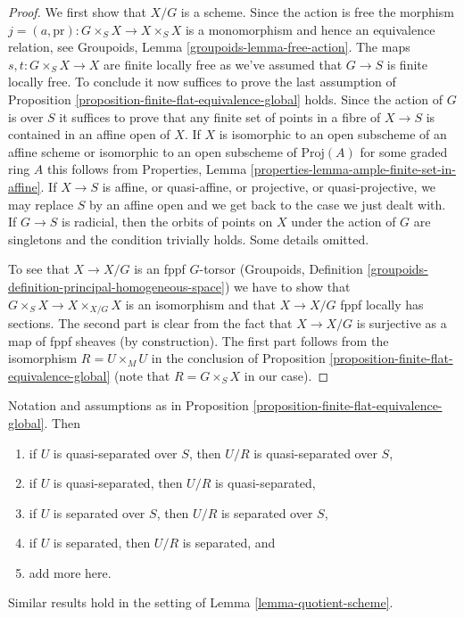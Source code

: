 \begin{proof}
We first show that $X/G$ is a scheme. Since the action is free the morphism
$j = (a, \text{pr}) : G \times_S X \to X \times_S X$
is a monomorphism and hence an equivalence relation, see
Groupoids, Lemma \ref{groupoids-lemma-free-action}. The maps
$s, t : G \times_S X \to X$
are finite locally free as we've assumed that $G \to S$ is finite locally
free. To conclude it now suffices to prove the last assumption of
Proposition \ref{proposition-finite-flat-equivalence-global} holds.
Since the action of $G$ is over $S$ it suffices to prove that
any finite set of points in a fibre of $X \to S$ is contained in an
affine open of $X$. If $X$ is isomorphic to an open subscheme of an
affine scheme or isomorphic to an open subscheme of $\text{Proj}(A)$
for some graded ring $A$ this follows from
Properties, Lemma \ref{properties-lemma-ample-finite-set-in-affine}.
If $X \to S$ is affine, or quasi-affine, or projective, or
quasi-projective, we may replace $S$ by an affine open and we
get back to the case we just dealt with. If $G \to S$ is radicial,
then the orbits of points on $X$ under the action of $G$ are singletons
and the condition trivially holds. Some details omitted.

\medskip\noindent
To see that $X \to X/G$ is an fppf $G$-torsor
(Groupoids, Definition \ref{groupoids-definition-principal-homogeneous-space})
we have to show that $G \times_S X \to X \times_{X/G} X$
is an isomorphism and that $X \to X/G$ fppf locally has sections.
The second part is clear from the fact that $X \to X/G$ is surjective
as a map of fppf sheaves (by construction). The first part follows from
the isomorphism $R = U \times_M U$ in the conclusion of
Proposition \ref{proposition-finite-flat-equivalence-global}
(note that $R = G \times_S X$ in our case).
\end{proof}

\begin{lemma}
\label{lemma-quotient-separated}
Notation and assumptions as in
Proposition \ref{proposition-finite-flat-equivalence-global}. Then
\begin{enumerate}
\item if $U$ is quasi-separated over $S$, then $U/R$ is quasi-separated
over $S$,
\item if $U$ is quasi-separated, then $U/R$ is quasi-separated,
\item if $U$ is separated over $S$, then $U/R$ is separated over $S$,
\item if $U$ is separated, then $U/R$ is separated, and
\item add more here.
\end{enumerate}
Similar results hold in the setting of Lemma \ref{lemma-quotient-scheme}.
\end{lemma}

